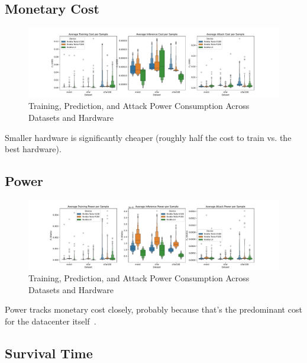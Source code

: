 \documentclass[conference]{IEEEtran}
\begin{document}
\subsection{Monetary Cost}


\begin{figure}
    \centering
    \includegraphics[width=\textwidth]{plots/combined/cost.pdf}
    \caption{Training, Prediction, and Attack Power Consumption Across Datasets and Hardware}
    \label{fig:time}
\end{figure}
Smaller hardware is significantly cheaper (roughly half the cost to train vs. the best hardware).

\subsection{Power}
\begin{figure}
    \centering
    \includegraphics[width=\textwidth]{plots/combined/power.pdf}
    \caption{Training, Prediction, and Attack Power Consumption Across Datasets and Hardware}
    \label{fig:time}
\end{figure}
Power tracks monetary cost closely, probably because that's the predominant cost for the datacenter itself~\cite{}.

\subsection{Survival Time}

\end{document}
